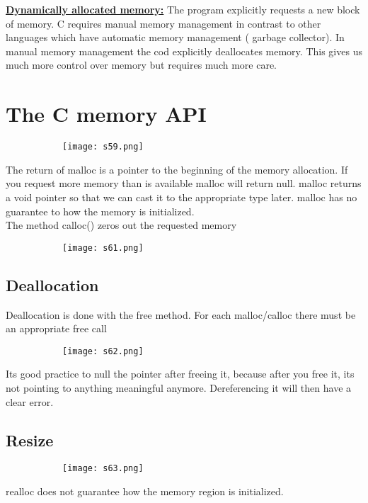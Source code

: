 \documentclass[8pt]{extreport}
\begin{document}
 \underline{\textbf{Dynamically allocated memory:}}
The program explicitly requests a new block of memory. C requires manual memory management in contrast to other languages which have automatic memory management ( garbage collector). In manual memory management the cod explicitly deallocates memory. This gives us much more control over memory but requires much more care.

\section{The C memory API}
\begin{figure}[H]
\centering
\begin{subfigure}[b]{0.4\linewidth}
\texttt{[image: s59.png]}
\end{subfigure}
\end{figure}
The return of malloc is a pointer to the beginning of the memory allocation. If you request more memory than is available malloc will return null. malloc returns a void pointer so that we can cast it to the appropriate type later. malloc has no guarantee to how the memory is initialized.\\
The method calloc() zeros out the requested memory
\begin{figure}[H]
\centering
\begin{subfigure}[b]{0.4\linewidth}
\texttt{[image: s61.png]}
\end{subfigure}
\end{figure}

\subsection{Deallocation}

Deallocation is done with the free method. For each malloc/calloc there must be an appropriate free call
\begin{figure}[H]
\centering
\begin{subfigure}[b]{0.4\linewidth}
\texttt{[image: s62.png]}
\end{subfigure}
\end{figure}
Its good practice to null the pointer after freeing it, because after you free it, its not pointing to anything meaningful anymore. Dereferencing it will then have a clear error.

\subsection{Resize}
\begin{figure}[H]
\centering
\begin{subfigure}[b]{0.4\linewidth}
\texttt{[image: s63.png]}
\end{subfigure}
\end{figure}
realloc does not guarantee how the memory region is initialized.
\end{document}
